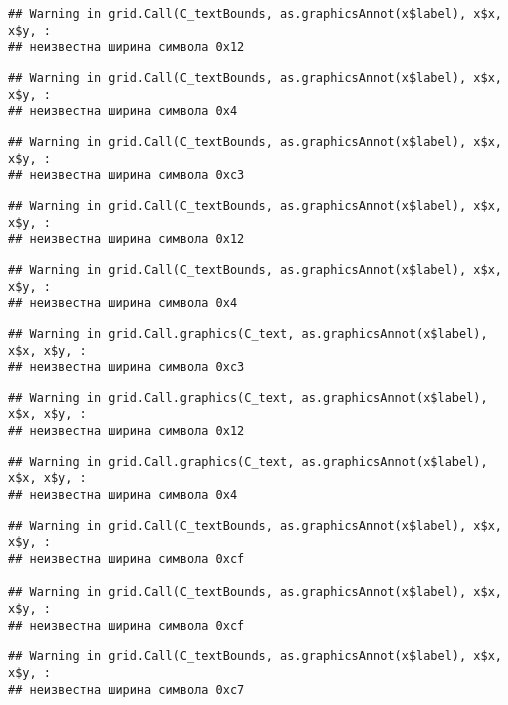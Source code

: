 \documentclass[
]{article}
\begin{document}
\begin{verbatim}
## Warning in grid.Call(C_textBounds, as.graphicsAnnot(x$label), x$x, x$y, :
## неизвестна ширина символа 0x12
\end{verbatim}

\begin{verbatim}
## Warning in grid.Call(C_textBounds, as.graphicsAnnot(x$label), x$x, x$y, :
## неизвестна ширина символа 0x4
\end{verbatim}

\begin{verbatim}
## Warning in grid.Call(C_textBounds, as.graphicsAnnot(x$label), x$x, x$y, :
## неизвестна ширина символа 0xc3
\end{verbatim}

\begin{verbatim}
## Warning in grid.Call(C_textBounds, as.graphicsAnnot(x$label), x$x, x$y, :
## неизвестна ширина символа 0x12
\end{verbatim}

\begin{verbatim}
## Warning in grid.Call(C_textBounds, as.graphicsAnnot(x$label), x$x, x$y, :
## неизвестна ширина символа 0x4
\end{verbatim}

\begin{verbatim}
## Warning in grid.Call.graphics(C_text, as.graphicsAnnot(x$label), x$x, x$y, :
## неизвестна ширина символа 0xc3
\end{verbatim}

\begin{verbatim}
## Warning in grid.Call.graphics(C_text, as.graphicsAnnot(x$label), x$x, x$y, :
## неизвестна ширина символа 0x12
\end{verbatim}

\begin{verbatim}
## Warning in grid.Call.graphics(C_text, as.graphicsAnnot(x$label), x$x, x$y, :
## неизвестна ширина символа 0x4
\end{verbatim}

\begin{verbatim}
## Warning in grid.Call(C_textBounds, as.graphicsAnnot(x$label), x$x, x$y, :
## неизвестна ширина символа 0xcf

## Warning in grid.Call(C_textBounds, as.graphicsAnnot(x$label), x$x, x$y, :
## неизвестна ширина символа 0xcf
\end{verbatim}

\begin{verbatim}
## Warning in grid.Call(C_textBounds, as.graphicsAnnot(x$label), x$x, x$y, :
## неизвестна ширина символа 0xc7
\end{verbatim}
\end{document}
